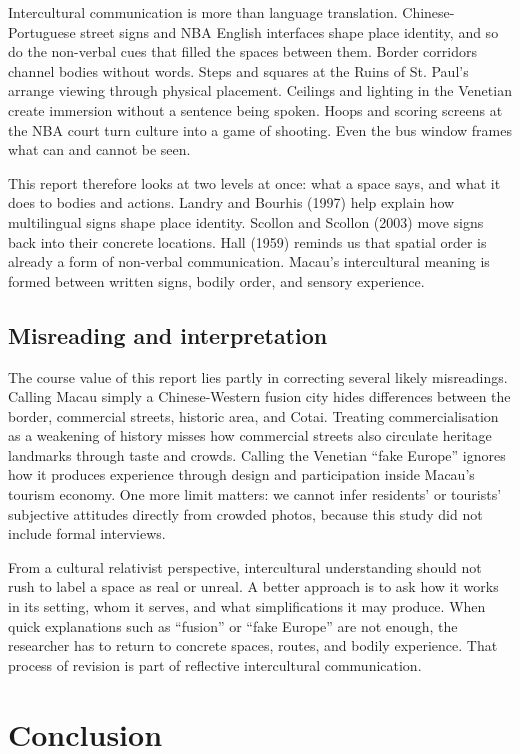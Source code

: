 \documentclass[12pt,a4paper]{article}
\begin{document}
Intercultural communication is more than language translation. Chinese-Portuguese street signs and NBA English interfaces shape place identity, and so do the non-verbal cues that filled the spaces between them. Border corridors channel bodies without words. Steps and squares at the Ruins of St. Paul's arrange viewing through physical placement. Ceilings and lighting in the Venetian create immersion without a sentence being spoken. Hoops and scoring screens at the NBA court turn culture into a game of shooting. Even the bus window frames what can and cannot be seen.

This report therefore looks at two levels at once: what a space says, and what it does to bodies and actions. Landry and Bourhis (1997) help explain how multilingual signs shape place identity. Scollon and Scollon (2003) move signs back into their concrete locations. Hall (1959) reminds us that spatial order is already a form of non-verbal communication. Macau's intercultural meaning is formed between written signs, bodily order, and sensory experience.

\subsection{Misreading and interpretation}

The course value of this report lies partly in correcting several likely misreadings. Calling Macau simply a Chinese-Western fusion city hides differences between the border, commercial streets, historic area, and Cotai. Treating commercialisation as a weakening of history misses how commercial streets also circulate heritage landmarks through taste and crowds. Calling the Venetian ``fake Europe'' ignores how it produces experience through design and participation inside Macau's tourism economy. One more limit matters: we cannot infer residents' or tourists' subjective attitudes directly from crowded photos, because this study did not include formal interviews.

From a cultural relativist perspective, intercultural understanding should not rush to label a space as real or unreal. A better approach is to ask how it works in its setting, whom it serves, and what simplifications it may produce. When quick explanations such as ``fusion'' or ``fake Europe'' are not enough, the researcher has to return to concrete spaces, routes, and bodily experience. That process of revision is part of reflective intercultural communication.

\section{Conclusion}
\end{document}
